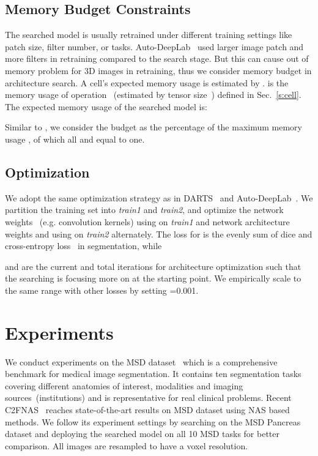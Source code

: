 \documentclass[final]{cvpr}
\begin{document}
\subsection{Memory Budget Constraints}
The searched model is usually retrained under different training settings like patch size, filter number, or tasks. Auto-DeepLab~\cite{liu2019auto} used  larger image patch and  more filters in retraining compared to the search stage. But this can cause out of memory problem for 3D images in retraining, thus we consider memory budget in architecture search. A cell's expected memory usage is estimated by .  is the memory usage of operation ~(estimated by tensor size~\cite{gao2020estimating}) defined in Sec.~\ref{s:cell}. The expected memory usage  of the searched model is:

Similar to \cite{li2020learning}, we consider the budget as the percentage  of the maximum memory usage , of which all  and  equal to one. 

\subsection{Optimization}
We adopt the same optimization strategy as in DARTS~\cite{liu2018darts} and Auto-DeepLab~\cite{liu2019auto}. We partition the training set into \emph{train1} and \emph{train2}, and optimize the network weights ~(e.g. convolution kernels) using  on \emph{train1} and network architecture weights  and  using  on \emph{train2} alternately. The loss  for  is the evenly sum of dice and cross-entropy loss~\cite{yu2020c2fnas} in segmentation, while

 and  are the current and total iterations for architecture optimization such that the searching is focusing more on  at the starting point. We empirically scale  to the same range with other losses by setting =0.001.
\section{Experiments}
We conduct experiments on the MSD dataset~\cite{simpson2019large} which is a comprehensive benchmark for medical image segmentation. It contains ten segmentation tasks covering different anatomies of interest, modalities and imaging sources~(institutions) and is representative for real clinical problems. Recent C2FNAS~\cite{yu2020c2fnas} reaches state-of-the-art results on MSD dataset using NAS based methods. We follow its experiment settings by searching on the MSD Pancreas dataset and deploying the searched model on all 10 MSD tasks for better comparison. All images are resampled to have a   voxel resolution.
\end{document}
